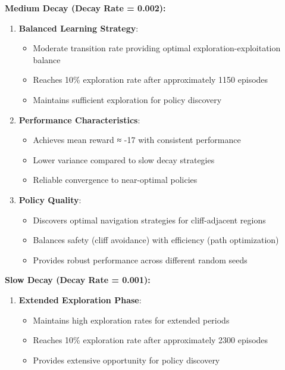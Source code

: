 \documentclass[12pt]{article}
\begin{document}
{{{\textbf{Medium Decay (Decay Rate = 0.002):}
\begin{enumerate}
    \item \textbf{Balanced Learning Strategy}:
    \begin{itemize}
        \item Moderate transition rate providing optimal exploration-exploitation balance
        \item Reaches 10\% exploration rate after approximately 1150 episodes
        \item Maintains sufficient exploration for policy discovery
    \end{itemize}
    
    \item \textbf{Performance Characteristics}:
    \begin{itemize}
        \item Achieves mean reward ≈ -17 with consistent performance
        \item Lower variance compared to slow decay strategies
        \item Reliable convergence to near-optimal policies
    \end{itemize}
    
    \item \textbf{Policy Quality}:
    \begin{itemize}
        \item Discovers optimal navigation strategies for cliff-adjacent regions
        \item Balances safety (cliff avoidance) with efficiency (path optimization)
        \item Provides robust performance across different random seeds
    \end{itemize}
\end{enumerate}

\textbf{Slow Decay (Decay Rate = 0.001):}
\begin{enumerate}
    \item \textbf{Extended Exploration Phase}:
    \begin{itemize}
        \item Maintains high exploration rates for extended periods
        \item Reaches 10\% exploration rate after approximately 2300 episodes
        \item Provides extensive opportunity for policy discovery
    \end{itemize}
    

\end{enumerate}}}}
\end{document}
